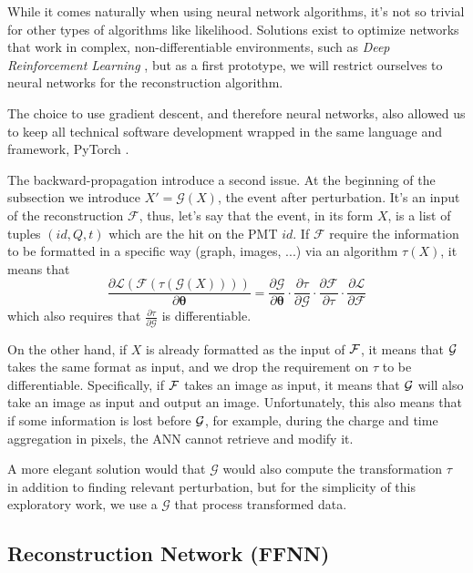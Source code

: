 \documentclass[../main.tex]{subfiles}
\begin{document}
While it comes naturally when using neural network algorithms, it's not so trivial for other types of algorithms like likelihood. Solutions exist to optimize networks that work in complex, non-differentiable environments, such as \textit{Deep Reinforcement Learning} \cite{kiran_deep_2021, vinyals_grandmaster_2019}, but as a first prototype, we will restrict ourselves to neural networks for the reconstruction algorithm.

The choice to use gradient descent, and therefore neural networks, also allowed us to keep all technical software development wrapped in the same language and framework, PyTorch \cite{ansel_pytorch_2024}.

The backward-propagation introduce a second issue. At the beginning of the subsection we introduce $X' = \mathcal{G}(X)$, the event after perturbation. It's an input of the reconstruction $\mathcal{F}$, thus, let's say that the event, in its form $X$, is a list of tuples $(id, Q, t)$ which are the hit on the PMT $id$. If $\mathcal{F}$ require the information to be formatted in a specific way (graph, images, ...) via an algorithm $\tau(X)$, it means that
\begin{equation}
  \frac{\partial \mathcal{L}(\mathcal{F}(\tau(\mathcal{G}(X))))}{\partial \bm{\theta}} = \frac{\partial \mathcal{G}}{\partial \bm{\theta}} \cdot \frac{\partial \tau}{\partial \mathcal{G}} \cdot \frac{\partial \mathcal{F}}{\partial \tau} \cdot \frac{\partial \mathcal{L}}{\partial \mathcal{F}}
\end{equation}
which also requires that $\frac{\partial \tau}{\partial \mathcal{G}}$ is differentiable.

On the other hand, if $X$ is already formatted as the input of ${\cal F}$, it means that ${\cal G}$ takes the same format as input, and we drop the requirement on $\tau$ to be differentiable. Specifically, if ${\cal F}$ takes an image as input, it means that ${\cal G}$ will also take an image as input and output an image. Unfortunately, this also means that if some information is lost before ${\cal G}$, for example, during the charge and time aggregation in pixels, the ANN cannot retrieve and modify it.

A more elegant solution would that $\mathcal{G}$ would also compute the transformation $\tau$ in addition to finding relevant perturbation, but for the simplicity of this exploratory work, we use a $\mathcal{G}$ that process transformed data.

\subsection{Reconstruction Network (FFNN)}
\label{sec:janne:arch:reco}
\end{document}
